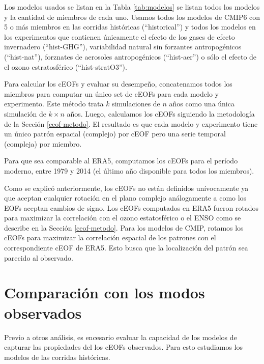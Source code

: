 \documentclass[12pt,oneside]{reedthesis}
\begin{document}
Los modelos usados se listan en la Tabla \ref{tab:modelos} se listan todos los modelos y la cantidad de miembros de cada uno.
Usamos todos los modelos de CMIP6 con 5 o más miembros en las corridas históricas (``historical'') y todos los modelos en los experimentos que contienen únicamente el efecto de los gases de efecto invernadero (``hist-GHG''), variabilidad natural sin forzantes antropogénicos (``hist-nat''), forznates de aerosoles antropogénicos (``hist-aer'') o sólo el efecto de el ozono estratosférico (``hist-stratO3'').

Para calcular los cEOFs y evaluar su desempeño, concatenamos todos los miembros para computar un único set de cEOFs para cada modelo y experimento.
Este método trata \(k\) simulaciones de \(n\) años como una única simulación de \(k\times n\) años.
Luego, calculamos los cEOFs siguiendo la metodología de la Sección \ref{ceof-metodo}.
El resultado es que cada modelo y experimento tiene un único patrón espacial (complejo) por cEOF pero una serie temporal (compleja) por miembro.

Para que sea comparable al ERA5, computamos los cEOFs para el período moderno, entre 1979 y 2014 (el último año disponible para todos los miembros).

Como se explicó anteriormente, los cEOFs no están definidos unívocamente ya que aceptan cualquier rotación en el plano complejo análogamente a como los EOFs aceptan cambios de signo.
Los cEOFs computados en ERA5 fueron rotados para maximizar la correlación con el ozono estatosférico o el ENSO como se describe en la Sección \ref{ceof-metodo}.
Para los modelos de CMIP, rotamos los cEOFs para maximizar la correlación espacial de los patrones con el correspondiente cEOF de ERA5.
Esto busca que la localización del patrón sea parecido al observado.

\hypertarget{comparaciuxf3n-con-los-modos-observados}{%
\section{Comparación con los modos observados}\label{comparaciuxf3n-con-los-modos-observados}}

Previo a otros análisis, es encesario evaluar la capacidad de los modelos de capturar las propiedades del los cEOFs observados.
Para esto estudiamos los modelos de las corridas históricas.
\end{document}
